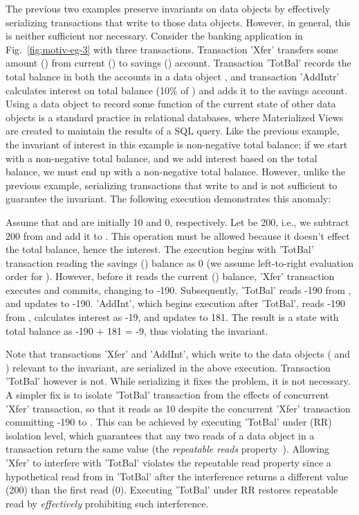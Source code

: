 The previous two examples preserve invariants on data objects by
effectively serializing transactions that write to those data objects.
However, in general, this is neither sufficient nor necessary. Consider
the banking application in Fig.~\ref{fig:motiv-eg-3} with three
transactions. Transaction 'Xfer' transfers some amount () from
current () to savings () account.  Transaction 'TotBal'
records the total balance in both the accounts in a data object ,
and transaction 'AddIntr' calculates interest on total balance (10\%
of ) and adds it to the savings account. Using a data object to
record some function of the current state of other data objects is a
standard practice in relational databases, where Materialized
Views~\cite{oraclematview} are created to maintain the results of a
SQL query. Like the previous example, the invariant of interest in
this example is non-negative total balance; if we start with a
non-negative total balance, and we add interest based on the total
balance, we must end up with a non-negative total balance.  However,
unlike the previous example, serializing transactions that write to
 and  is not sufficient to guarantee the invariant.  The
following execution demonstrates this anomaly:

Assume that  and  are initially 10 and 0, respectively. Let
 be 200, i.e., we subtract 200 from  and add it to .
This operation must be allowed because it doesn't effect the total
balance, hence the interest. The execution begins with 'TotBal'
transaction reading the savings () balance as 0 (we assume
left-to-right evaluation order for ). However, before it
reads the current () balance, 'Xfer' transaction executes and
commits, changing  to -190. Subsequently, 'TotBal' reads -190
from , and updates  to -190. 'AddInt', which begins
execution after 'TotBal', reads -190 from , calculates interest
as -19, and updates  to 181. The result is a state with total
balance as -190 + 181 = -9, thus violating the invariant.

Note that transactions 'Xfer' and 'AddInt', which write to the data
objects ( and ) relevant to the invariant, are serialized in
the above execution. Transaction 'TotBal' however is not. While
serializing it fixes the problem, it is not necessary. A simpler fix
is to isolate 'TotBal' transaction from the effects of concurrent
'Xfer' transaction, so that it reads  as 10 despite the
concurrent 'Xfer' transaction committing -190 to . This can be
achieved by executing 'TotBal' under  (RR)
isolation level, which guarantees that any two reads of a data object
in a transaction return the same value (the \emph{repeatable reads}
property~\cite{berenson}). Allowing 'Xfer' to interfere with 'TotBal'
violates the repeatable read property since a hypothetical read from
 in 'TotBal' after the interference returns a different value
(200) than the first read (0). Executing 'TotBal' under RR restores
repeatable read by \emph{effectively} prohibiting such interference.


